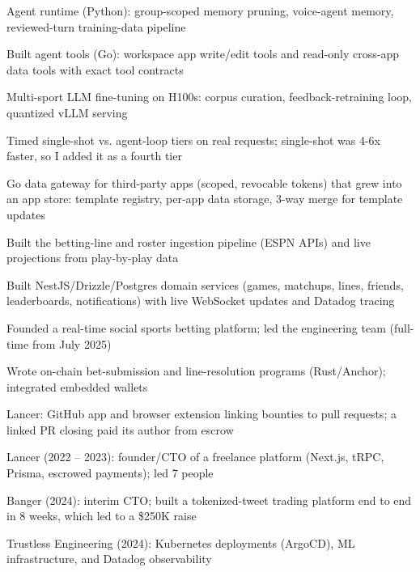 \documentclass[print]{jack-resume}
\begin{document}
\begin{tightemize}
    \item Agent runtime (Python): group-scoped memory pruning, voice-agent memory, reviewed-turn training-data pipeline
    \item Built agent tools (Go): workspace app write/edit tools and read-only cross-app data tools with exact tool contracts
    \item Multi-sport LLM fine-tuning on H100s: corpus curation, feedback-retraining loop, quantized vLLM serving
    \item Timed single-shot vs. agent-loop tiers on real requests; single-shot was 4-6x faster, so I added it as a fourth tier
    \item Go data gateway for third-party apps (scoped, revocable tokens) that grew into an app store: template registry, per-app data storage, 3-way merge for template updates
\end{tightemize}
\sectionsep

\begin{tightemize}
    \item Built the betting-line and roster ingestion pipeline (ESPN APIs) and live projections from play-by-play data
    \item Built NestJS/Drizzle/Postgres domain services (games, matchups, lines, friends, leaderboards, notifications) with live WebSocket updates and Datadog tracing
    \item Founded a real-time social sports betting platform; led the engineering team (full-time from July 2025)
    \item Wrote on-chain bet-submission and line-resolution programs (Rust/Anchor); integrated embedded wallets
\end{tightemize}
\sectionsep

\begin{tightemize}
    \item Lancer: GitHub app and browser extension linking bounties to pull requests; a linked PR closing paid its author from escrow
    \item Lancer (2022 -- 2023): founder/CTO of a freelance platform (Next.js, tRPC, Prisma, escrowed payments); led 7 people
    \item Banger (2024): interim CTO; built a tokenized-tweet trading platform end to end in 8 weeks, which led to a \$250K raise
    \item Trustless Engineering (2024): Kubernetes deployments (ArgoCD), ML infrastructure, and Datadog observability
\end{tightemize}
\sectionsep
\end{document}
